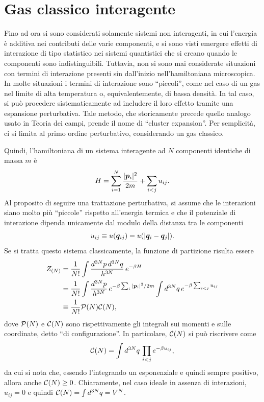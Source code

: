 \section{Gas classico interagente}
Fino ad ora si sono considerati solamente sistemi non interagenti, in cui l'energia è additiva nei contributi delle varie componenti, e si sono visti emergere effetti di interazione di tipo statistico nei sistemi quantistici che si creano quando le componenti sono indistinguibili. Tuttavia, non si sono mai considerate situazioni con termini di interazione presenti sin dall'inizio nell'hamiltoniana microscopica. In molte situazioni i termini di interazione sono ``piccoli'', come nel caso di un gas nel limite di alta temperatura o, equivalentemente, di bassa densità. In tal caso, si può procedere sistematicamente ad includere il loro effetto tramite una espansione perturbativa. Tale metodo, che storicamente precede quello analogo usato in Teoria dei campi, prende il nome di ``cluster expansion''. Per semplicità, ci si limita al primo ordine perturbativo, considerando un gas classico. 

Quindi, l'hamiltoniana di un sistema interagente ad $N$ componenti identiche di massa $m$ è
\begin{equation}
    H = \sum_{i=1}^N\frac{|\bm{p}_i|^2}{2m} + \sum_{i < j}u_{ij}.
\end{equation}
Al proposito di seguire una trattazione perturbativa, si assume che le interazioni siano molto più ``piccole'' rispetto all'energia termica e che il potenziale di interazione dipenda unicamente dal modulo della distanza tra le componenti
\begin{equation}
    u_{ij} \equiv u(\bm{q}_{ij}) = u(|\bm{q}_i - \bm{q}_j|).
\end{equation}
Se si tratta questo sistema classicamente, la funzione di partizione risulta essere
\begin{equation}
\label{eq: funzione di partizione sistema interagente (canonico)}
    \begin{split}
        Z_{(N)} &= \frac{1}{N!}\int\frac{d^{3N}p\,d^{3N}q}{h^{3N}}\,e^{-\beta H} \\
        &= \frac{1}{N!}\int\frac{d^{3N}p}{h^{3N}}\,e^{-\beta\sum_i|\bm{p}_i|^2/2m}\int d^{3N}q\,e^{-\beta \sum_{i<j}u_{ij}} \\
        &\equiv \frac{1}{N!}\mathcal{P}(N)\mathcal{C}(N),
    \end{split}
\end{equation}
dove $\mathcal{P}(N)$ e $\mathcal{C}(N)$ sono rispettivamente gli integrali sui momenti e sulle coordinate, detto ``di configurazione''. In particolare, $\mathcal{C}(N)$ si può riscrivere come
\begin{equation}
    \mathcal{C}(N) = \int d^{3N}q\,\prod_{i<j}e^{-\beta u_{ij}},
\end{equation}
da cui si nota che, essendo l'integrando un esponenziale e quindi sempre positivo, allora anche $\mathcal{C}(N) \ge 0$. Chiaramente, nel caso ideale in assenza di interazioni, $u_{ij} = 0$ e quindi $\mathcal{C}(N) = \int d^{3N}q = V^N$. 

